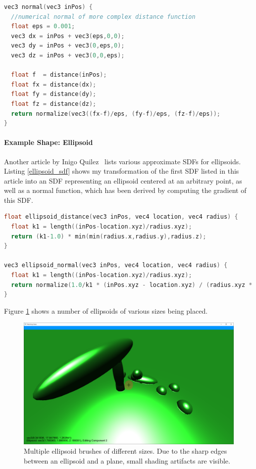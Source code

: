 \documentclass[11pt]{article}
\begin{document}
\begin{lstlisting}[language=C++,label={numerical_gradient},caption={Approximation of the normal of an SDF, using the method of finite differences.}]
vec3 normal(vec3 inPos) {
  //numerical normal of more complex distance function
  float eps = 0.001;
  vec3 dx = inPos + vec3(eps,0,0);
  vec3 dy = inPos + vec3(0,eps,0);
  vec3 dz = inPos + vec3(0,0,eps);

  float f  = distance(inPos);
  float fx = distance(dx);
  float fy = distance(dy);
  float fz = distance(dz);
  return normalize(vec3((fx-f)/eps, (fy-f)/eps, (fz-f)/eps));
}
\end{lstlisting}

\paragraph{Example Shape: Ellipsoid}
Another article by Inigo Quilez~\cite{quilez:ellipsoid} lists various approximate SDFs for ellipsoids. Listing \ref{ellipsoid_sdf} shows my transformation of the first SDF listed in this article into an SDF representing an ellipsoid centered at an arbitrary point, as well as a normal function, which has been derived by computing the gradient of this SDF.

\begin{lstlisting}[language=C++,label={ellipsoid_sdf},caption={Approximate SDF and normal function for an ellipsoid.}]
float ellipsoid_distance(vec3 inPos, vec4 location, vec4 radius) {
  float k1 = length((inPos-location.xyz)/radius.xyz);
  return (k1-1.0) * min(min(radius.x,radius.y),radius.z);
}

vec3 ellipsoid_normal(vec3 inPos, vec4 location, vec4 radius) {
  float k1 = length((inPos-location.xyz)/radius.xyz);
  return normalize(1.0/k1 * (inPos.xyz - location.xyz) / (radius.xyz * radius.xyz));
}
\end{lstlisting}
Figure \ref{fig:editing_ellipsoids} shows a number of ellipsoids of various sizes being placed.
\begin{figure}[H]
  \includegraphics[width=\textwidth]{editing_ellipsoids}
  \caption{Multiple ellipsoid brushes of different sizes. Due to the sharp edges between an ellipsoid and a plane, small shading artifacts are visible.}
  \label{fig:editing_ellipsoids}
\end{figure}
\end{document}

